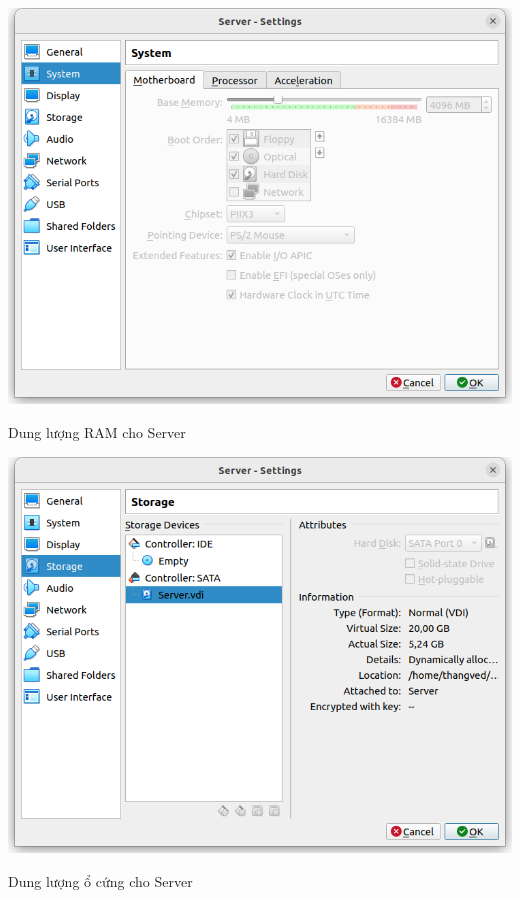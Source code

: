 \documentclass[a4paper, 11pt]{article}
\begin{document}
\begin{enumerate}
          \begin{minipage}{\linewidth}
              \captionsetup{type=figure}
              \centering
              \includegraphics[width=\linewidth]{images/server-ram.png}
              \caption{Dung lượng RAM cho Server}
              \label{figure:server-ram}
          \end{minipage}

          \begin{minipage}
              {\linewidth}
              \captionsetup{type=figure}
              \centering
              \includegraphics[width=\linewidth]{images/server-disk.png}
              \caption{Dung lượng ổ cứng cho Server}
              \label{figure:server-disk}
          \end{minipage}


\end{enumerate}
\end{document}
